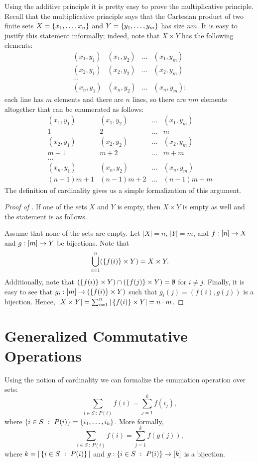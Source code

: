 Using the additive principle it is pretty easy to prove the multiplicative
principle. Recall that the multiplicative principle says that the Cartesian
product of two finite sets $X = \set{x_1, \dots, x_n}$ and 
$Y = \set{y_1, \dots, y_m}$ has size $nm$. It is easy to justify this statement
informally; indeed, note that $X \times Y$ has the following elements:
\[
  \begin{matrix}
    (x_1, y_1) & (x_1, y_2) & \dots & (x_1, y_m) \\
    (x_2, y_1) & (x_2, y_2) & \dots & (x_2, y_m) \\
    \dots \\
    (x_n, y_1) & (x_n, y_2) & \dots & (x_n, y_m);
  \end{matrix}
\]
each line has $m$ elements and there are $n$ lines, so there are $nm$ elements
altogether that can be enumerated as follows:
\[
  \begin{matrix}
    (x_1, y_1) & (x_1, y_2) & \dots & (x_1, y_m) \\
    1          & 2          & \dots & m \\
    (x_2, y_1) & (x_2, y_2) & \dots & (x_2, y_m) \\
    m + 1      & m + 2      & \dots & m + m \\
    \dots \\
    (x_n, y_1) & (x_n, y_2) & \dots & (x_n, y_m) \\
    (n - 1) m + 1 & (n - 1) m + 2 & \dots & (n - 1) m + m
  \end{matrix}
\]
The definition of cardinality gives us a simple formalization of this argument.
\begin{proof}[Proof of ]
  If one of the sets $X$ and $Y$ is empty, then $X \times Y$ is empty as well
  and the statement is as follows.

  Assume that none of the sets are empty. Let $|X| = n$, $|Y| = m$, and
  $f : {[{n}]} \to X$ and $g : {[{m}]} \to Y$ be bijections.
  Note that
  \[
    \bigcup_{i = 1}^n (\set{f(i)} \times Y) = X \times Y.
  \]
  Additionally, note that $(\set{f(i)} \times Y) \cap (\set{f(j)} \times Y) =
  \emptyset$ for $i \neq j$. Finally, it is easy to see that $g_i : \range{m} \to
  (\set{f(i)} \times Y)$ such that $g_i(j) = (f(i), g(j))$ is a bijection.
  Hence,
  $|X \times Y| = \sum_{i = 1}^n |\set{f(i)} \times Y| = n \cdot m$.
\end{proof}


\section{Generalized Commutative Operations}
\label{section:generalized-sum}
Using the notion of cardinality we can formalize the summation operation over
sets:
\[
    \sum_{i \in S ~:~ P(i)} f(i) = \sum_{j = 1}^k f(i_j),
\]
where $\set[P(i)]{i \in S} = \set{i_1, \dots, i_k}$. More formally,
\[
    \sum_{i \in S ~:~ P(i)} f(i) = \sum_{j = 1}^k f(g(j)),
\]
where $k = |\set[P(i)]{i \in S}|$ and $g : \set[P(i)]{i \in S} \to \range{k}$ is
a bijection.

